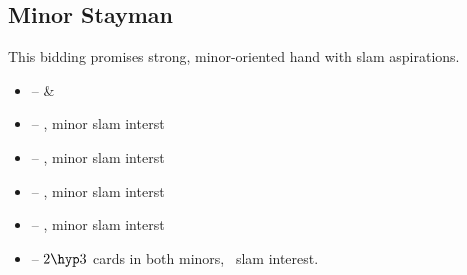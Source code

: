 \subsection{Minor Stayman}
\label{subsec:minor-stayman}

\begin{flushleft}
   \linebreak
  This bidding promises strong, minor-oriented hand with slam aspirations.
\end{flushleft}
\begin{itemize}
  \item {} --  \& 
  \item \ctr{3\c} -- , minor slam interst
  \item \ctr{3\d} -- , minor slam interst
  \item \ctr{3\h} -- , minor slam interst
  \item \ctr{3\s} -- , minor slam interst
  \item {} -- $2\hyp 3$ cards in both minors, \no\ slam interest.
\end{itemize}
